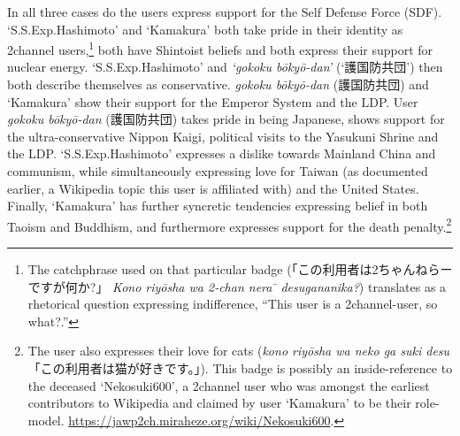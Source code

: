 \documentclass[10pt,british,A4paper,,openany]{memoir}
\begin{document}
In all three cases do the users express support for the Self Defense
Force (SDF). `S.S.Exp.Hashimoto' and `Kamakura' both take pride in their
identity as 2channel users,\footnote{The catchphrase used on that
  particular badge (「この利用者は2ちゃんねらーですが何か?」 \emph{Kono
  riyōsha wa 2-chan nera ̄ desugananika?}) translates as a rhetorical
  question expressing indifference, ``This user is a 2channel-user, so
  what?.''} both have Shintoist beliefs and both express their support
for nuclear energy. `S.S.Exp.Hashimoto' and \emph{`gokoku bōkyō-dan'}
(`護国防共団') then both describe themselves as conservative.
\emph{gokoku bōkyō-dan} (護国防共団) and `Kamakura' show their support
for the Emperor System and the LDP. User \emph{gokoku bōkyō-dan}
(護国防共団) takes pride in being Japanese, shows support for the
ultra-conservative Nippon Kaigi, political visits to the Yasukuni Shrine
and the LDP. `S.S.Exp.Hashimoto' expresses a dislike towards Mainland
China and communism, while simultaneously expressing love for Taiwan (as
documented earlier, a Wikipedia topic this user is affiliated with) and
the United States. Finally, `Kamakura' has further syncretic tendencies
expressing belief in both Taoism and Buddhism, and furthermore expresses
support for the death penalty.\footnote{The user also expresses their
  love for cats (\emph{kono riyōsha wa neko ga suki desu}
  「この利用者は猫が好きです。」). This badge is possibly an
  inside-reference to the deceased `Nekosuki600', a 2channel user who
  was amongst the earliest contributors to Wikipedia and claimed by user
  `Kamakura' to be their role-model.
  \url{https://jawp2ch.miraheze.org/wiki/Nekosuki600}.}
\end{document}
